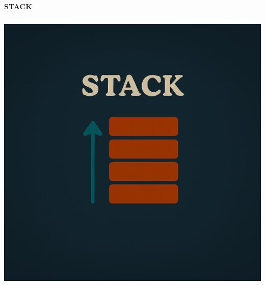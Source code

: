 \documentclass[a4paper,10pt]{book}
\begin{document}
\begin{center}

{\fontsize{55}{20}\selectfont \textcolor{headingcolor}{\bfseries STACK}}
\end{center}

\vspace{50mm}

\begin{center}
\includegraphics[height=13.88cm, width=17cm, keepaspectratio]{Pics/stack.png}
\end{center}
\end{document}
